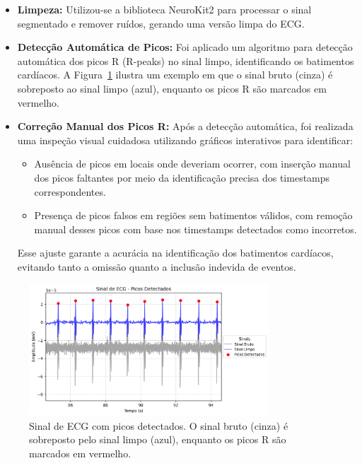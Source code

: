 \begin{itemize}
    \item \textbf{Limpeza:} Utilizou-se a biblioteca NeuroKit2 para processar o sinal segmentado e remover ruídos, gerando uma versão limpa do ECG.
    
    \item \textbf{Detecção Automática de Picos:} Foi aplicado um algoritmo para detecção automática dos picos R (R-peaks) no sinal limpo, identificando os batimentos cardíacos. A Figura~\ref{fig:ecg_picos_detectados} ilustra um exemplo em que o sinal bruto (cinza) é sobreposto ao sinal limpo (azul), enquanto os picos R são marcados em vermelho.
    
    \item \textbf{Correção Manual dos Picos R:} Após a detecção automática, foi realizada uma inspeção visual cuidadosa utilizando gráficos interativos para identificar:
    \begin{itemize}
        \item Ausência de picos em locais onde deveriam ocorrer, com inserção manual dos picos faltantes por meio da identificação precisa dos timestamps correspondentes.
        \item Presença de picos falsos em regiões sem batimentos válidos, com remoção manual desses picos com base nos timestamps detectados como incorretos.
    \end{itemize}
    Esse ajuste garante a acurácia na identificação dos batimentos cardíacos, evitando tanto a omissão quanto a inclusão indevida de eventos.
\end{itemize}

\begin{figure}[htb]
    \centering
    \includegraphics[width=0.8\textwidth]{figs/2_preprocessamento_ecg/1_Sinal_de_ECG_-_Picos_Detectados_zoom.png}
    \caption{Sinal de ECG com picos detectados. O sinal bruto (cinza) é sobreposto pelo sinal limpo (azul), enquanto os picos R são marcados em vermelho.}
    \label{fig:ecg_picos_detectados}
\end{figure}

